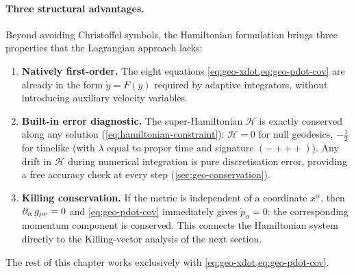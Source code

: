 \paragraph{Three structural advantages.}

Beyond avoiding Christoffel symbols, the Hamiltonian formulation brings three
properties that the Lagrangian approach lacks:
%
\begin{enumerate}
\item \textbf{Natively first-order.}  The eight equations
  \cref{eq:geo-xdot,eq:geo-pdot-cov} are already in the form
  $\dot{y} = F(y)$ required by adaptive integrators, without
  introducing auxiliary velocity variables.

\item \textbf{Built-in error diagnostic.}  The super-Hamiltonian
  $\mathcal{H}$ is exactly conserved along any solution
  (\cref{eq:hamiltonian-constraint}): $\mathcal{H} = 0$ for null
  geodesics, $-\tfrac{1}{2}$ for timelike (with $\lambda$ equal to proper
  time and signature $({-}{+}{+}{+})$).  Any drift in
  $\mathcal{H}$ during numerical integration is pure discretisation
  error, providing a free accuracy check at every step
  (\cref{sec:geo-conservation}).

\item \textbf{Killing conservation.}  If the metric is independent of a
  coordinate $x^\alpha$, then $\partial_{\alpha}\,g_{\mu\nu} = 0$ and
  \cref{eq:geo-pdot-cov} immediately gives $\dot{p}_\alpha = 0$: the
  corresponding momentum component is conserved.  This connects the
  Hamiltonian system directly to the Killing-vector analysis of the next
  section.
\end{enumerate}
%
The rest of this chapter works exclusively with
\cref{eq:geo-xdot,eq:geo-pdot-cov}.
